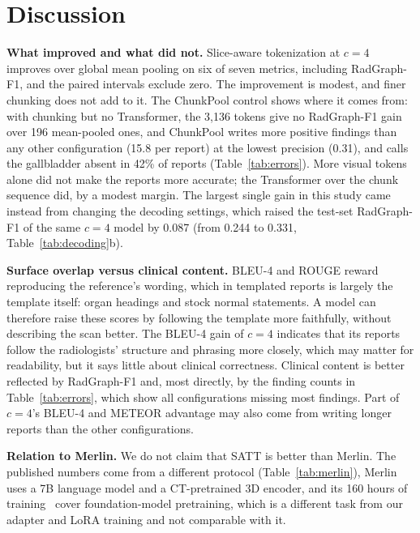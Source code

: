 \documentclass[conference]{IEEEtran}
\begin{document}
\section{Discussion}

\textbf{What improved and what did not.} Slice-aware tokenization at $c=4$
improves over global mean pooling on six of seven metrics, including
RadGraph-F1, and the paired intervals exclude zero. The improvement is
modest, and finer chunking does not add to it. The ChunkPool control shows
where it comes from: with chunking but no Transformer, the 3,136 tokens give
no RadGraph-F1 gain over 196 mean-pooled ones, and ChunkPool writes more positive findings
than any other configuration (15.8 per report) at the lowest precision
(0.31), and calls the gallbladder absent in 42\% of reports
(Table~\ref{tab:errors}). More visual tokens alone did not make the reports
more accurate; the Transformer over the chunk sequence did, by a modest
margin. The largest single gain in
this study came instead from changing the decoding settings, which raised the
test-set RadGraph-F1 of the same $c=4$ model by 0.087 (from 0.244 to 0.331,
Table~\ref{tab:decoding}b).

\textbf{Surface overlap versus clinical content.} BLEU-4 and ROUGE reward
reproducing the reference's wording, which in templated reports is largely
the template itself: organ headings and stock normal statements. A model can
therefore raise these scores by following the template more faithfully,
without describing the scan better. The BLEU-4 gain of $c=4$ indicates that
its reports follow the radiologists' structure and phrasing more closely,
which may matter for readability, but it says little about clinical
correctness. Clinical content
is better reflected by RadGraph-F1 and, most directly, by the finding counts
in Table~\ref{tab:errors}, which show all configurations missing most
findings. Part of $c=4$'s BLEU-4 and METEOR advantage may also come from
writing longer reports than the other configurations.

\textbf{Relation to Merlin.} We do not claim that SATT is better than
Merlin. The published numbers come from a different protocol
(Table~\ref{tab:merlin}), Merlin uses a 7B language model and a CT-pretrained
3D encoder, and its 160 hours of training~\cite{merlin} cover foundation-model
pretraining, which is a different task from our adapter and LoRA training and
not comparable with it.

\end{document}
